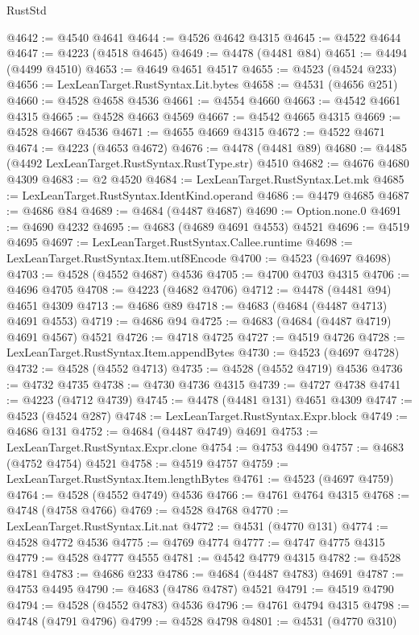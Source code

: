 \begin{lexlean}{RustStd}
\begin{coremodule}
@4642 := @4540 @4641
@4644 := @4526 @4642 @4315
@4645 := @4522 @4644
@4647 := @4223 (@4518 @4645)
@4649 := @4478 (@4481 @84)
@4651 := @4494 (@4499 @4510)
@4653 := @4649 @4651 @4517
@4655 := @4523 (@4524 @233)
@4656 := LexLeanTarget.RustSyntax.Lit.bytes
@4658 := @4531 (@4656 @251)
@4660 := @4528 @4658 @4536
@4661 := @4554 @4660
@4663 := @4542 @4661 @4315
@4665 := @4528 @4663 @4569
@4667 := @4542 @4665 @4315
@4669 := @4528 @4667 @4536
@4671 := @4655 @4669 @4315
@4672 := @4522 @4671
@4674 := @4223 (@4653 @4672)
@4676 := @4478 (@4481 @89)
@4680 := @4485 (@4492 LexLeanTarget.RustSyntax.RustType.str) @4510
@4682 := @4676 @4680 @4309
@4683 := @2 @4520
@4684 := LexLeanTarget.RustSyntax.Let.mk
@4685 := LexLeanTarget.RustSyntax.IdentKind.operand
@4686 := @4479 @4685
@4687 := @4686 @84
@4689 := @4684 (@4487 @4687)
@4690 := Option.none.{0}
@4691 := @4690 @4232
@4695 := @4683 (@4689 @4691 @4553) @4521
@4696 := @4519 @4695
@4697 := LexLeanTarget.RustSyntax.Callee.runtime
@4698 := LexLeanTarget.RustSyntax.Item.utf8Encode
@4700 := @4523 (@4697 @4698)
@4703 := @4528 (@4552 @4687) @4536
@4705 := @4700 @4703 @4315
@4706 := @4696 @4705
@4708 := @4223 (@4682 @4706)
@4712 := @4478 (@4481 @94) @4651 @4309
@4713 := @4686 @89
@4718 := @4683 (@4684 (@4487 @4713) @4691 @4553)
@4719 := @4686 @94
@4725 := @4683 (@4684 (@4487 @4719) @4691 @4567) @4521
@4726 := @4718 @4725
@4727 := @4519 @4726
@4728 := LexLeanTarget.RustSyntax.Item.appendBytes
@4730 := @4523 (@4697 @4728)
@4732 := @4528 (@4552 @4713)
@4735 := @4528 (@4552 @4719) @4536
@4736 := @4732 @4735
@4738 := @4730 @4736 @4315
@4739 := @4727 @4738
@4741 := @4223 (@4712 @4739)
@4745 := @4478 (@4481 @131) @4651 @4309
@4747 := @4523 (@4524 @287)
@4748 := LexLeanTarget.RustSyntax.Expr.block
@4749 := @4686 @131
@4752 := @4684 (@4487 @4749) @4691
@4753 := LexLeanTarget.RustSyntax.Expr.clone
@4754 := @4753 @4490
@4757 := @4683 (@4752 @4754) @4521
@4758 := @4519 @4757
@4759 := LexLeanTarget.RustSyntax.Item.lengthBytes
@4761 := @4523 (@4697 @4759)
@4764 := @4528 (@4552 @4749) @4536
@4766 := @4761 @4764 @4315
@4768 := @4748 (@4758 @4766)
@4769 := @4528 @4768
@4770 := LexLeanTarget.RustSyntax.Lit.nat
@4772 := @4531 (@4770 @131)
@4774 := @4528 @4772 @4536
@4775 := @4769 @4774
@4777 := @4747 @4775 @4315
@4779 := @4528 @4777 @4555
@4781 := @4542 @4779 @4315
@4782 := @4528 @4781
@4783 := @4686 @233
@4786 := @4684 (@4487 @4783) @4691
@4787 := @4753 @4495
@4790 := @4683 (@4786 @4787) @4521
@4791 := @4519 @4790
@4794 := @4528 (@4552 @4783) @4536
@4796 := @4761 @4794 @4315
@4798 := @4748 (@4791 @4796)
@4799 := @4528 @4798
@4801 := @4531 (@4770 @310)

\end{coremodule}
\end{lexlean}
